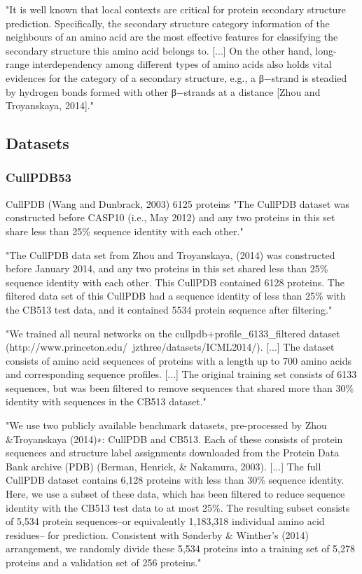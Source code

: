\documentclass[]{scrartcl}
\begin{document}
"It is well known that local contexts are critical for protein secondary structure prediction. Specifically, the secondary structure category information of the neighbours of an amino acid are the most effective features for classifying the secondary structure this amino acid belongs to. [...] On the other hand, long-range interdependency among different types of amino acids also holds vital evidences for the category of a secondary structure, e.g., a β−strand is steadied by hydrogen bonds formed with other β−strands at a distance [Zhou and Troyanskaya, 2014]." \cite{Li2016}

\subsection{Datasets}
\subsubsection{CullPDB53}
CullPDB (Wang and Dunbrack, 2003)
6125 proteins
"The CullPDB dataset was constructed before CASP10 (i.e., May 2012) and any two proteins in this set share less than 25\% sequence identity with each other." \cite{Wang2016}

"The CullPDB data set from Zhou and Troyanskaya, (2014) was constructed before January 2014, and any two proteins in this set shared less than 25\% sequence identity with each other. This CullPDB contained 6128 proteins. The filtered data set of this CullPDB had a sequence identity of less than 25\% with the CB513 test data, and it contained 5534 protein sequence after filtering." \cite{Fang2017}

"We trained all neural networks on the cullpdb+profile\_6133\_filtered dataset (http://www.princeton.edu/~jzthree/datasets/ICML2014/). [...] The dataset consists of amino acid sequences of proteins with a length up to 700 amino acids and corresponding sequence profiles. [...] The original training set consists of 6133 sequences, but was been filtered to remove sequences that shared more than 30\% identity with sequences in the CB513 dataset." \cite{Jurtz2017}

"We use two publicly available benchmark datasets, pre-processed by Zhou \&Troyanskaya (2014)∗: CullPDB and CB513. Each of these consists of protein sequences and structure label assignments downloaded from the Protein Data Bank archive (PDB) (Berman, Henrick, \& Nakamura, 2003). [...] The full CullPDB dataset contains 6,128 proteins with less than 30\% sequence identity. Here, we use a subset of these data, which has been filtered to reduce sequence identity with the CB513 test data to at most 25\%. The resulting subset consists of 5,534 protein sequences–or equivalently 1,183,318 individual amino acid residues– for prediction. Consistent with Sønderby \& Winther’s (2014) arrangement, we randomly divide these 5,534 proteins into a training set of 5,278 proteins and a validation set of 256 proteins." \cite{Busia2017}
\end{document}
